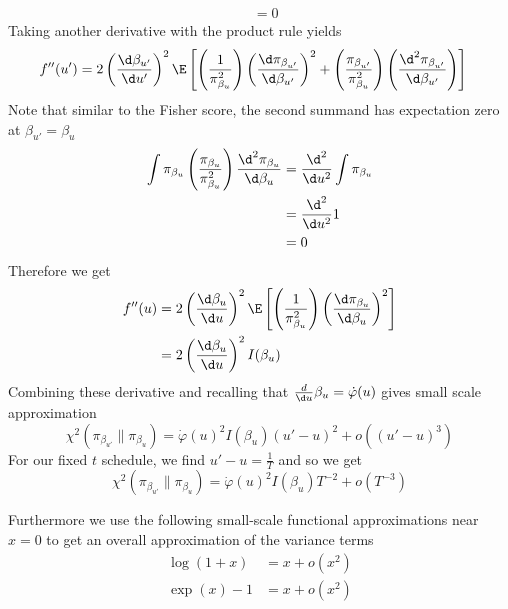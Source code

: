 \documentclass{article}
\begin{document}
\begin{enumerate}
\begin{align}
            &= 0
    \end{align}
    Taking another derivative with the product rule yields
    \begin{align}
        f''(u') &= 
            2\left(\frac{\d \beta_{u'}}{\d u'}\right)^2 \E
            \left[
                \left(
                    \frac 1 {\pi_{\beta_u}^2}
                \right)
                \left(
                    \frac {\d \pi_{\beta_{u'}}}{\d \beta_{u'}}
                \right)^2
                + 
                \left(\frac{\pi_{\beta_{u'}}}{\pi_{\beta_u}^2}\right)
                \left(\frac{\d^2 \pi_{\beta_{u'}}}{\d \beta_{u'}}\right)
            \right]
    \end{align}
    Note that similar to the Fisher score, the second summand has expectation
    zero at $\beta_{u'} = \beta_u$
    \begin{align}
        \int \pi_{\beta_u}\left(\frac{\pi_{\beta_{u}}}{\pi_{\beta_u}^2}\right)
        \frac{\d^2 \pi_{\beta_{u}}}{\d \beta_{u}} &= 
            \frac{\d^2}{\d u^2} \int \pi_{\beta_u} \\
        &= \frac{\d^2}{\d u^2} 1 \\
        &= 0
    \end{align}
    Therefore we get
    \begin{align}
        f''(u) &= 
            2\left(\frac{\d \beta_{u}}{\d u}\right)^2 \E \left[
                \left(
                    \frac 1 {\pi_{\beta_u}^2}
                \right)
                \left(
                    \frac {\d \pi_{\beta_{u}}}{\d \beta_{u}}
                \right)^2 
            \right] \\
            &=  2\left(\frac{\d \beta_{u}}{\d u}\right)^2 I(\beta_u)
    \end{align}
    Combining these derivative and recalling that
    $\frac{d}{\d u}\beta_u = \dot\varphi(u)$ gives small scale approximation
    \[
        \chi^2 (\pi_{\beta_{u'}} \| \pi_{\beta_u}) 
        = \dot\varphi(u)^2 I(\beta_u)(u'-u)^2 + o((u'- u)^3)
    \]
    For our fixed $t$ schedule, we find $u'-u = \frac 1 T$ and so we get
     \[
        \chi^2 (\pi_{\beta_{u'}} \| \pi_{\beta_u}) 
        = \dot\varphi(u)^2 I(\beta_u)T^{-2} + o(T^{-3})
    \]

    Furthermore we use the following small-scale functional approximations near
    $x = 0$ to
    get an overall approximation of the variance terms
    \begin{align}
        \log(1+x) &= x + o(x^2) \\
        \exp(x)-1 &= x + o(x^2)
    \end{align}


\end{enumerate}
\end{document}

